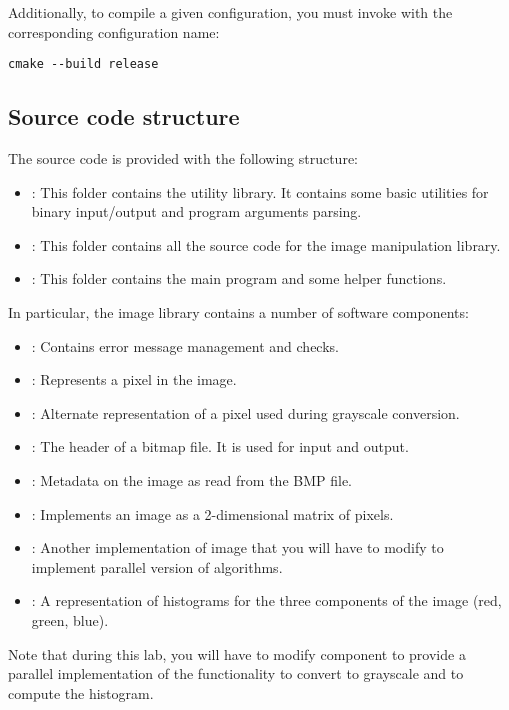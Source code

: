 Additionally, to compile a given configuration, you must invoke 
with the corresponding configuration name:

\begin{lstlisting}[style=terminal,aboveskip=1em,belowskip=1em]
cmake --build release
\end{lstlisting}


\subsection{Source code structure}

The source code is provided with the following structure:


\begin{itemize}

\item {}: This folder contains the utility library. It contains
some basic utilities for binary input/output and program arguments parsing.

\item {}: This folder contains all the source code for the image manipulation library.

\item {}: This folder contains the main program and some helper
functions.

\end{itemize}

In particular, the image library contains a number of software components:

\begin{itemize}

\item {}: Contains error message management and checks.

\item {}: Represents a pixel in the image.

\item {}: Alternate representation of a pixel used during
grayscale conversion.

\item {}: The header of a bitmap file. It is used for input
and output.

\item {}: Metadata on the image as read from the BMP file.

\item {}: Implements an image as a 2-dimensional matrix of pixels.

\item {}: Another implementation of image that you will
have to modify to implement parallel version of algorithms.

\item {}: A representation of histograms for the three components
of the image (red, green, blue).

\end{itemize}

Note that during this lab, you will have to modify component
 to provide a parallel implementation of the
functionality to convert to grayscale and to compute the histogram.
